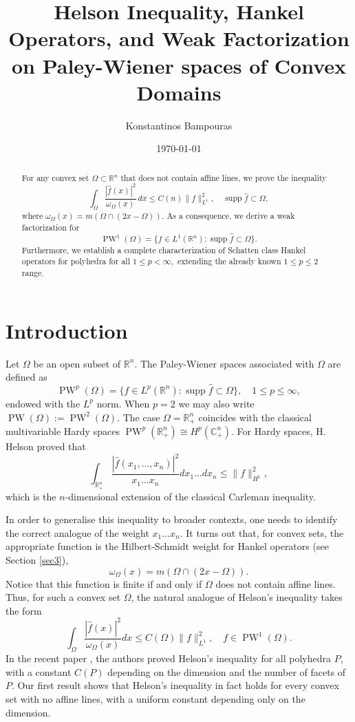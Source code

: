 \documentclass{amsart}
\title[Helson inequality and Hankel operators for Paley-Wiener spaces]{Helson Inequality, Hankel Operators, and Weak Factorization on Paley-Wiener spaces of Convex Domains}
\author[K. Bampouras]{Konstantinos Bampouras}
\date{\today}
\theoremstyle{plain}
\DeclareMathOperator{\PW}{PW}
\DeclareMathOperator{\supp}{supp}
\begin{document}
	
	\begin{abstract}
	For any convex set $\Omega\subset\mathbb{R}^n$ that does not contain affine lines, we prove the inequality
	$$\int_\Omega\frac{|\hat{f}(x)|^2}{\omega_\Omega(x)}\,dx\leq C(n)\|f\|_{L^1}^2,\quad \supp\hat{f}\subset\Omega,$$
	where $\omega_\Omega(x)=m(\Omega\cap(2x-\Omega))$. As a consequence, we derive a weak factorization for
	$$\PW^1(\Omega)=\{f\in L^1(\mathbb{R}^n):\supp\hat{f}\subset\Omega\}.$$
	Furthermore, we establish a complete characterization of Schatten class Hankel operators for polyhedra for all $1\leq p<\infty,$ extending the already known $1\leq p\leq 2$  range.
	
	\end{abstract}
	
	\maketitle
	
	
	
\section{Introduction}
Let $\Omega$ be an open subset of $\mathbb{R}^n.$ The Paley-Wiener spaces associated with $\Omega$ are defined as
$$\PW^p(\Omega)=\{f\in L^p(\mathbb{R}^n):\supp\hat{f}\subset\Omega\}, \quad 1\leq p\leq \infty,$$
endowed with the $L^p$ norm. When $p=2$ we may also write $\PW(\Omega):=\PW^2(\Omega)$. The case $\Omega=\mathbb{R}^n_+$ coincides with the classical multivariable Hardy spaces $\PW^p(\mathbb{R}^n_+)\cong H^p(\mathbb{C}_+^n)$. For Hardy spaces, H. Helson \cite{MR2263964} proved that
$$\int_{\mathbb{R}^n_+}\dfrac{|\hat{f}(x_1,\dots,x_n)|^2}{x_1\dots x_n}dx_1\dots dx_n\leq \|f\|_{H^1}^2,$$
which is the $n$-dimensional extension of the classical Carleman inequality.

In order to generalise this inequality to broader contexts, one needs to identify the correct analogue of the weight $x_1\dots x_n$. It turns out that, for convex sets, the appropriate function is the Hilbert-Schmidt weight for Hankel operators (see Section \ref{sec3}),
$$\omega_\Omega(x)=m(\Omega\cap (2x-\Omega)).$$
Notice that this function is finite if and only if $\Omega$ does not contain affine lines. Thus, for such a convex set $\Omega$, the natural analogue of Helson's inequality takes the form
$$\int_{\Omega}\dfrac{|\hat{f}(x)|^2}{\omega_\Omega(x)}dx\leq C(\Omega) \|f\|_{L^1}^2,\quad f\in\PW^1(\Omega).$$
In the recent paper \cite{bampouras2026boundaryweightedfourierinequalitiesconvex}, the authors proved Helson's inequality for all polyhedra $P$, with a constant $C(P)$ depending on the dimension and the number of facets of $P$. Our first result shows that Helson's inequality in fact holds for every convex set with no affine lines, with a uniform constant depending only on the dimension.
\end{document}
